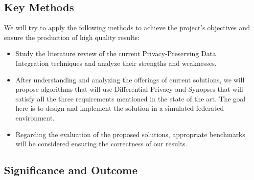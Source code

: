 \documentclass[12pt]{article}
\begin{document}
\subsection{Key Methods}
We will try to apply the following methods to achieve the
project's objectives and ensure the production of high quality results:
\begin{itemize}
   \item Study the literature review of the current Privacy-Preserving Data Integration techniques and analyze their strengths 
   and weaknesses. %
   \item After understanding and analyzing the offerings of current solutions, we will propose algorithms that will use Differential Privacy 
   and Synopses that will satisfy all the three requirements mentioned in the state of the art. 
   The goal here is to design and implement the solution in a simulated federated environment.
   \item Regarding the evaluation of the proposed solutions, appropriate benchmarks will be considered
   ensuring the correctness of our results.
\end{itemize}

\subsection{Significance and Outcome}






\end{document}
